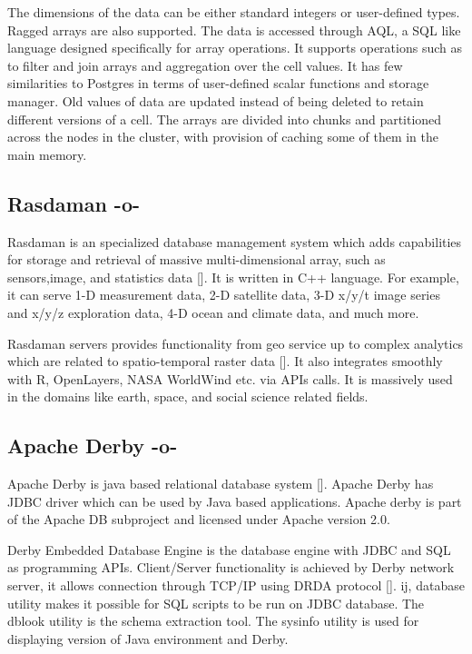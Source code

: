 The dimensions of the data can be either standard integers or
user-defined types. Ragged arrays are also supported. The data is
accessed through AQL, a SQL like language designed specifically for
array operations. It supports operations such as to filter and join
arrays and aggregation over the cell values. It has few similarities
to Postgres in terms of user-defined scalar functions and storage
manager. Old values of data are updated instead of being deleted to
retain different versions of a cell.  The arrays are divided into
chunks and partitioned across the nodes in the cluster, with provision
of caching some of them in the main memory.



\subsection{Rasdaman -o-}

Rasdaman is an specialized database management system which adds
capabilities for storage and retrieval of massive multi-dimensional
array, such as sensors,image, and statistics data
[\cite{www-rasdaman-wiki}]. It is written in C++ language. For
example, it can serve 1-D measurement data, 2-D satellite data, 3-D
x/y/t image series and x/y/z exploration data, 4-D ocean and climate
data, and much more.

Rasdaman servers provides functionality from geo service up to complex
analytics which are related to spatio-temporal raster
data [\cite{www-rasdaman-official}].  It also integrates smoothly with
R, OpenLayers, NASA WorldWind etc. via APIs calls. It is massively
used in the domains like earth, space, and social science related
fields.


     
\subsection{Apache Derby -o-}

Apache Derby is java based relational database
system [\cite{www-apachederby}]. Apache Derby has JDBC driver which can
be used by Java based applications. Apache derby is part of the Apache
DB subproject and licensed under Apache version 2.0.

Derby Embedded Database Engine is the database engine with JDBC and
SQL as programming APIs.  Client/Server functionality is achieved by
Derby network server, it allows connection through TCP/IP using DRDA
protocol [\cite{www-apachederbycharter}]. ij, database utility makes it
possible for SQL scripts to be run on JDBC database. The dblook
utility is the schema extraction tool. The sysinfo utility is used for
displaying version of Java environment and Derby.

